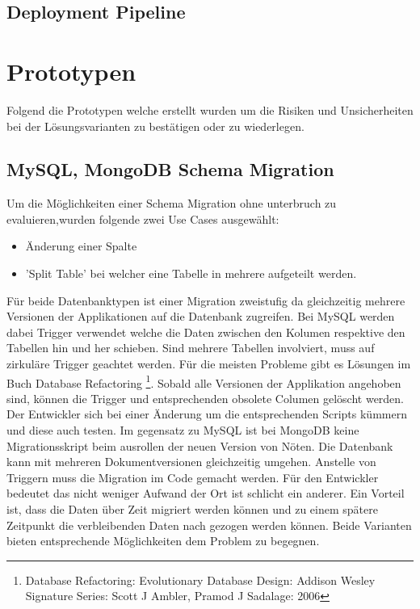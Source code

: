 \subsection{Deployment Pipeline}

\section{Prototypen}

Folgend die Prototypen welche erstellt wurden um die Risiken und Unsicherheiten bei der Lösungsvarianten zu bestätigen oder zu wiederlegen. 

\subsection{MySQL, MongoDB Schema Migration}

Um die Möglichkeiten einer Schema Migration ohne unterbruch zu evaluieren,wurden folgende zwei Use Cases ausgewählt:
\newline
\begin{itemize}
	\item Änderung einer Spalte
	\item 'Split Table' bei welcher eine Tabelle in mehrere aufgeteilt werden.
\end{itemize}

Für beide Datenbanktypen ist einer Migration zweistufig da gleichzeitig mehrere Versionen der Applikationen auf die Datenbank zugreifen. Bei MySQL werden dabei Trigger verwendet welche die Daten zwischen den Kolumen respektive den Tabellen hin und her schieben. Sind mehrere Tabellen involviert, muss auf zirkuläre Trigger geachtet werden. Für die meisten Probleme gibt es Lösungen im Buch Database Refactoring \footnote{Database Refactoring: Evolutionary Database Design: Addison Wesley Signature Series: Scott J Ambler, Pramod J Sadalage: 2006}. Sobald alle Versionen der Applikation angehoben sind, können die Trigger und entsprechenden obsolete Columen gelöscht werden. Der Entwickler sich bei einer Änderung um die entsprechenden Scripts kümmern und diese auch testen.\newline
Im gegensatz zu MySQL ist bei MongoDB keine Migrationsskript beim ausrollen der neuen Version von Nöten. Die Datenbank kann mit mehreren Dokumentversionen gleichzeitig umgehen. Anstelle von Triggern muss die Migration im Code gemacht werden. Für den Entwickler bedeutet das nicht weniger Aufwand der Ort ist schlicht ein anderer. Ein Vorteil ist, dass die Daten über Zeit migriert werden können und zu einem spätere Zeitpunkt die verbleibenden Daten nach gezogen werden können.\newline
Beide Varianten bieten entsprechende Möglichkeiten dem Problem zu begegnen.
 


